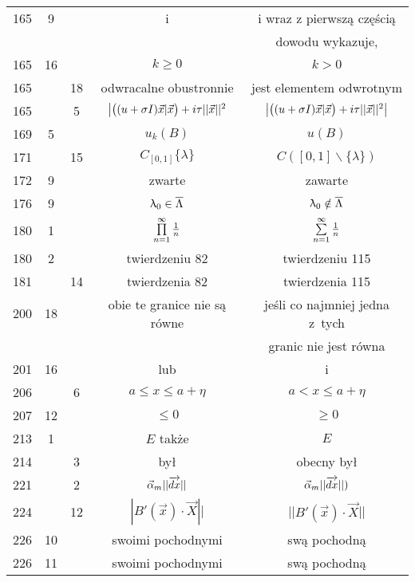 \documentclass[a4paper,11pt]{article}
\newcommand{\Prod}{\prod\limits}
\newcommand{\ora}{\overrightarrow}
\newcommand{\bs}{\backslash}
\begin{document}
\begin{center}
\begin{tabular}{|c|c|c|c|c|}
    165 &  9 & & i & i wraz z pierwszą częścią \\
    & & & & dowodu wykazuje, \\
    165 & 16 & & $k \geq 0$ & $k > 0$ \\
    165 & & 18 & odwracalne obustronnie & jest elementem odwrotnym \\
    165 & &  5 & $\big{ | } \big( ( u + \sigma I ) \vec{ x }
                 | \vec{ x } \big) + i \tau || \vec{ x } ||^{ 2 }$
           & $\big{ | } \big( ( u + \sigma I ) \vec{ x } | \vec{ x } \big)
             + i \tau || \vec{ x } ||^{ 2 } \big{ | }$ \\
    169 &  5 & & $u_{ k }( B )$ & $u( B )$ \\
    171 & & 15 & $C_{ [ 0, 1 ] } \{ \lambda \}$ & $C( [ 0, 1 ] \bs
                                                  \{ \lambda \} )$ \\
    172 &  9 & & zwarte & zawarte \\
    176 &  9 & & $\uplambda_{ 0 } \in \overline{ \Lambda }$ & $\uplambda_{ 0 }
                                              \notin \overline{ \Lambda }$ \\
    180 &  1 & & $\Prod^{ \infty }_{ n = 1 } \fr{ 1 }{ n }$
           & $\sum\limits^{ \infty }_{ n = 1 } \frac{ 1 }{ n }$ \\
    180 &  2 & & twierdzeniu 82 & twierdzeniu 115 \\
    181 & & 14 & twierdzenia 82 & twierdzenia 115 \\
    200 & 18 & & obie te granice nie są równe & jeśli co najmniej
                                                jedna z~tych \\
    & & & & granic nie jest równa \\
    201 & 16 & & lub & i \\
    206 & &  6 & $a \leq x \leq a + \eta$ & $a < x \leq a + \eta$ \\
    207 & 12 & & $\leq 0$ & $\geq 0$ \\
    213 &  1 & & $E$ także & $E$ \\
    214 & &  3 & był & obecny był \\
    221 & &  2 & $\vec{ \al }_{ m } || \ora{ dx } ||$
           & $\vec{ \al }_{ m } || \ora{ dx } || )$ \\
    224 & & 12 & $| B'( \vec{ x } ) \cdot \vec{ X } ||$
           & $|| B'( \vec{ x } ) \cdot \vec{ X } ||$ \\
    226 & 10 & & swoimi pochodnymi & swą pochodną \\
    226 & 11 & & swoimi pochodnymi & swą pochodną \\
    \hline
  \end{tabular}


\end{center}
\end{document}
